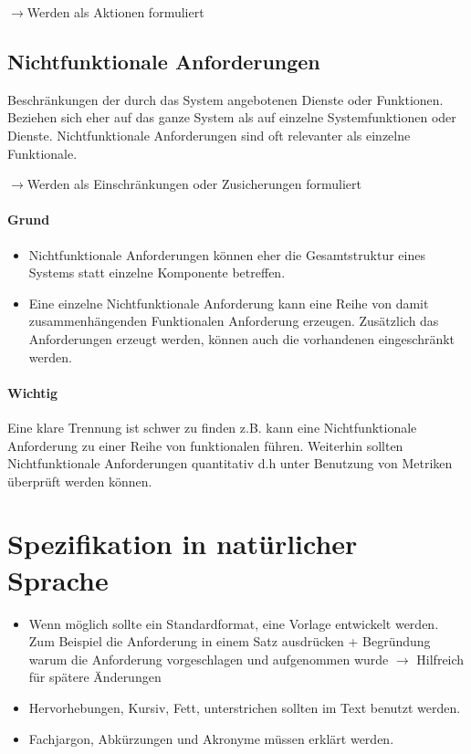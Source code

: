 \documentclass[parskip=full]{scrartcl}
\begin{document}
$\rightarrow$Werden als Aktionen formuliert

\subsection{Nichtfunktionale Anforderungen}
Beschränkungen der durch das System angebotenen Dienste oder Funktionen. Beziehen sich eher auf das ganze System als auf einzelne Systemfunktionen oder Dienste.
Nichtfunktionale Anforderungen sind oft relevanter als einzelne Funktionale.

$\rightarrow$Werden als Einschränkungen oder Zusicherungen formuliert
\paragraph{Grund}
\begin{itemize}[nosep]
	\item Nichtfunktionale Anforderungen können eher die Gesamtstruktur eines Systems statt einzelne Komponente betreffen.
	\item Eine einzelne Nichtfunktionale Anforderung kann eine Reihe von damit zusammenhängenden Funktionalen Anforderung erzeugen. Zusätzlich das Anforderungen erzeugt werden, können auch die vorhandenen eingeschränkt werden.
\end{itemize}
\paragraph{Wichtig}
Eine klare Trennung ist schwer zu finden z.B. kann eine Nichtfunktionale Anforderung zu einer Reihe von funktionalen führen. Weiterhin sollten Nichtfunktionale Anforderungen quantitativ d.h unter Benutzung von Metriken überprüft werden können.

\section{Spezifikation in natürlicher Sprache}
\begin{itemize}
	\item Wenn möglich sollte ein Standardformat, eine Vorlage entwickelt werden. Zum Beispiel die Anforderung in einem Satz ausdrücken + Begründung warum die Anforderung vorgeschlagen und aufgenommen wurde $\rightarrow$ Hilfreich für spätere Änderungen
	\item Hervorhebungen, Kursiv, Fett, unterstrichen sollten im Text benutzt werden.
	\item Fachjargon, Abkürzungen und Akronyme müssen erklärt werden.
\end{itemize}
\end{document}
